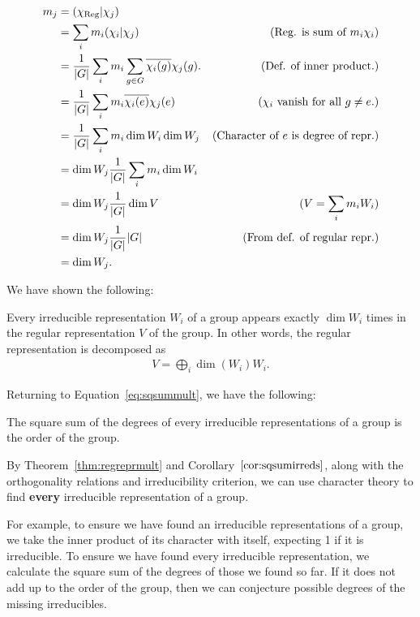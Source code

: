 {\allowdisplaybreaks\begin{align*}
	m_j &= (\chi_{\text{Reg}}|\chi_j) \\ &=  \sum_i m_i  (\chi_i|\chi_j)   & \text{(Reg. is sum of $m_i\chi_i$)}\\
	&= \frac{1}{|G|} \sum_i  m_i \sum_{g \in G} \overline{\chi_i(g) }{\chi_j(g)}. & \text{(Def. of inner product.)} \\
	&=  \frac{1}{|G|}\sum_i  m_i \overline{\chi_i(e) }{\chi_j(e)} & \text{($\chi_i$ vanish for all $g \neq e$.)} \\
	&= \frac{1}{|G|} \sum_i m_i \dim W_i \dim W_j & \text{(Character of $e$ is degree of repr.)} \\
	&= \dim W_j \frac{1}{|G|}  \sum_i m_i \dim W_i  & \\
		&= \dim W_j \frac{1}{|G|} \dim V & \text{($V = \sum_i m_i W_i$)} \\
	&= \dim W_j \frac{1}{|G|}  |G| & \text{(From def. of regular repr.)} \\
	& = \dim W_j.
\end{align*}}

We have shown the following:
\begin{theorem}\label{thm:regreprmult}
	Every irreducible representation $W_i$ of a group appears exactly $\dim W_i$ times in the regular representation $V$ of the group. In other words, the regular representation is decomposed as
	\begin{align*}
		V = \bigoplus_i \dim (W_i) W_i.
	\end{align*}
\end{theorem}

Returning to Equation~\ref{eq:sqsummult}, we have the following:
\begin{corollary}\label{cor:sqsumirreds}
	The square sum of the degrees of every irreducible representations of a group is the order of the group.
\end{corollary}

\begin{remark}
	By Theorem~\ref{thm:regreprmult} and Corollary~$\ref{cor:sqsumirreds}$, along with the orthogonality relations and irreducibility criterion, we can use character theory to find \textbf{every} irreducible representation of a group. 
\end{remark}

For example, to ensure we have found an irreducible representations of a group, we take the inner product of its character with itself, expecting 1 if it is irreducible. To ensure we have found every irreducible representation, we calculate the square sum of the degrees of those we found so far. If it does not add up to the order of the group, then we can conjecture possible degrees of the missing irreducibles.

